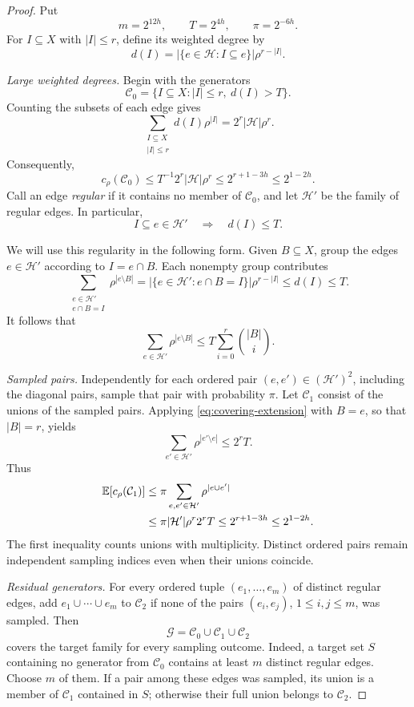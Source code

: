 \documentclass[11pt,letterpaper]{article}
\theoremstyle{definition}
\theoremstyle{remark}
\numberwithin{equation}{section}
\begin{document}
\begin{proof}
Put
\[
m=2^{12h},\qquad T=2^{4h},\qquad \pi=2^{-6h}.
\]
For \(I\subseteq X\) with \(|I|\le r\), define its weighted degree by
\[
d(I)=|\{e\in\mathcal H:I\subseteq e\}|\rho^{r-|I|}.
\]

\emph{Large weighted degrees.}
Begin with the generators
\[
\mathcal C_0=\{I\subseteq X:|I|\le r,\ d(I)>T\}.
\]
Counting the subsets of each edge gives
\[
\sum_{\substack{I\subseteq X\\|I|\le r}}d(I)\rho^{|I|}
=2^r|\mathcal H|\rho^r.
\]
Consequently,
\begin{equation}\label{eq:covering-initial-cost}
c_\rho(\mathcal C_0)
\le T^{-1}2^r|\mathcal H|\rho^r
\le2^{r+1-3h}\le2^{1-2h}.
\end{equation}
Call an edge \emph{regular} if it contains no member of \(\mathcal C_0\),
and let \(\mathcal H'\) be the family of regular edges. In particular,
\[
I\subseteq e\in\mathcal H'
\quad\Longrightarrow\quad d(I)\le T.
\]

We will use this regularity in the following form. Given \(B\subseteq X\),
group the edges \(e\in\mathcal H'\) according to \(I=e\cap B\).
Each nonempty group contributes
\[
\sum_{\substack{e\in\mathcal H'\\e\cap B=I}}
  \rho^{|e\setminus B|}
=|\{e\in\mathcal H':e\cap B=I\}|\rho^{r-|I|}
\le d(I)\le T.
\]
It follows that
\begin{equation}\label{eq:covering-extension}
\sum_{e\in\mathcal H'}\rho^{|e\setminus B|}
\le T\sum_{i=0}^r\binom{|B|}{i}.
\end{equation}

\emph{Sampled pairs.}
Independently for each ordered pair \((e,e')\in(\mathcal H')^2\),
including the diagonal pairs, sample that pair with probability \(\pi\).
Let \(\mathcal C_1\) consist of the unions of the sampled pairs. Applying
\eqref{eq:covering-extension} with \(B=e\), so that \(|B|=r\), yields
\[
\sum_{e'\in\mathcal H'}\rho^{|e'\setminus e|}\le2^rT.
\]
Thus
\begin{align}
\mathbb E[c_\rho(\mathcal C_1)]
&\le\pi\sum_{e,e'\in\mathcal H'}\rho^{|e\cup e'|}
\notag\\
&\le\pi|\mathcal H'|\rho^r2^rT
\le2^{r+1-3h}\le2^{1-2h}.
\label{eq:covering-pair-cost}
\end{align}
The first inequality counts unions with multiplicity. Distinct ordered
pairs remain independent sampling indices even when their unions coincide.

\emph{Residual generators.}
For every ordered tuple \((e_1,\ldots,e_m)\) of distinct regular edges,
add \(e_1\cup\cdots\cup e_m\) to \(\mathcal C_2\) if none of the pairs
\((e_i,e_j)\), \(1\le i,j\le m\), was sampled.
Then
\[
\mathcal G=\mathcal C_0\cup\mathcal C_1\cup\mathcal C_2
\]
covers the target family for every sampling outcome. Indeed, a target set
\(S\) containing no generator from \(\mathcal C_0\) contains at least \(m\)
distinct regular edges. Choose \(m\) of them. If a pair among these edges
was sampled, its union is a member of \(\mathcal C_1\) contained in \(S\);
otherwise their full union belongs to \(\mathcal C_2\).


\end{proof}
\end{document}
